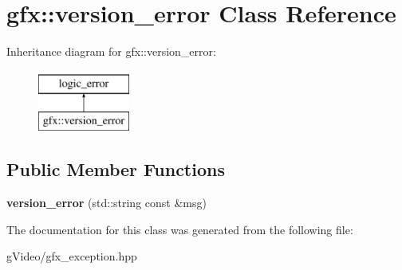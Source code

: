 \hypertarget{classgfx_1_1version__error}{\section{gfx\-:\-:version\-\_\-error Class Reference}
\label{classgfx_1_1version__error}
}
Inheritance diagram for gfx\-:\-:version\-\_\-error\-:\begin{figure}[H]
\begin{center}
\leavevmode
\includegraphics[height=2.000000cm]{classgfx_1_1version__error}
\end{center}
\end{figure}
\subsection*{Public Member Functions}
\begin{DoxyCompactItemize}
\item 
\hypertarget{classgfx_1_1version__error_a13678afa4c8f402a52af8b3736857007}{{\bfseries version\-\_\-error} (std\-::string const \&msg)}\label{classgfx_1_1version__error_a13678afa4c8f402a52af8b3736857007}

\end{DoxyCompactItemize}


The documentation for this class was generated from the following file\-:\begin{DoxyCompactItemize}
\item 
g\-Video/gfx\-\_\-exception.\-hpp\end{DoxyCompactItemize}
